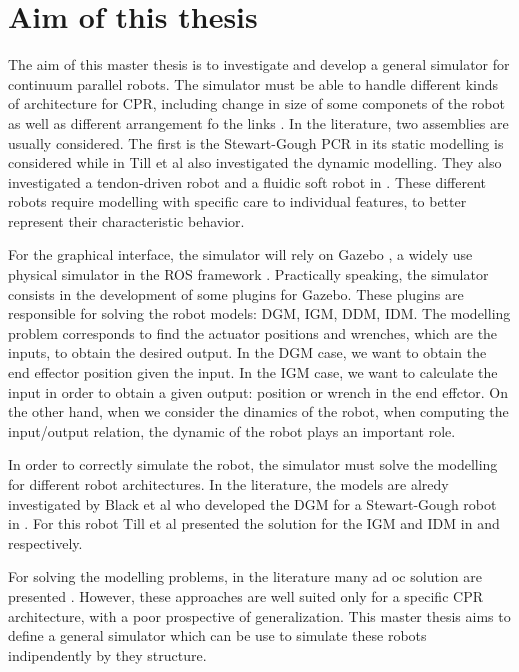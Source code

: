 \documentclass{thesisreport}
\begin{document}
 \section{Aim of this thesis}
 The aim of this master thesis is to investigate and develop a general simulator for continuum parallel robots. The simulator must be able to handle different kinds of architecture for CPR, including change in size of some componets of the robot as well as different arrangement fo the links \cite{bryson_toward_2014}. In the literature, two assemblies are usually considered. The first is the Stewart-Gough PCR in \cite{till_efficient_2015}\cite{black_parallel_2018} its static modelling is considered while in \cite{till_real-time_2019} Till et al also investigated the dynamic modelling. They also investigated a tendon-driven robot and a fluidic soft robot in \cite{till_real-time_2019}. These different robots require modelling with specific care to individual features, to better represent their characteristic behavior. 
 
 For the graphical interface, the simulator will rely on Gazebo \cite{koenig_design_2004}\cite{noauthor_gazebo_nodate}, a widely use physical simulator in the ROS framework \cite{noauthor_rosorg_nodate}. Practically speaking, the simulator consists in the development of some plugins for Gazebo. These plugins are responsible for solving the robot models: DGM, IGM, DDM, IDM.
  The modelling problem corresponds to find the actuator positions and wrenches, which are the inputs, to obtain the desired output. In the DGM case, we want to obtain the end effector position given the input. In the IGM case, we want to calculate the input in order to obtain a given output: position or wrench in the end effctor. On the other hand, when we consider the dinamics of the robot, when computing the input/output relation, the dynamic of the robot plays an important role. 
 
 In order to correctly simulate the robot, the simulator must solve the modelling for different robot architectures. In the literature, the models are alredy investigated by Black et al who developed the DGM for a Stewart-Gough robot in \cite{black_parallel_2018}. For this robot Till et al presented the solution for the IGM and IDM in \cite{till_real-time_2019} and \cite{till_efficient_2015} respectively.
 
 For solving the modelling problems, in the literature many ad oc solution are presented \cite{till_efficient_2015}\cite{black_parallel_2018}\cite{till_real-time_2019}. However, these approaches are well suited only for a specific CPR architecture, with a poor prospective of generalization. This master thesis aims to define a general simulator which can be use to simulate these robots indipendently by they structure. 
 
\end{document}
